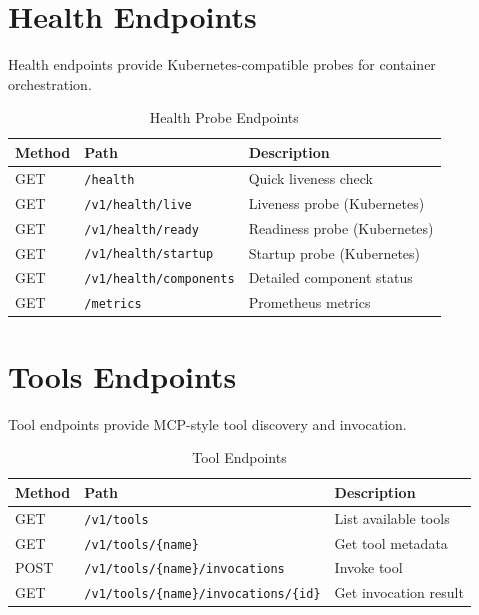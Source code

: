 \documentclass[a4paper,twoside]{sapthesis}
\begin{document}
\section{Health Endpoints}
\label{app:api:health}

Health endpoints provide Kubernetes-compatible probes for container orchestration.

\begin{table}[ht]
\centering
\caption{Health Probe Endpoints}
\label{tab:health-endpoints}
\small
\begin{tabularx}{\textwidth}{llX}
    \hline
    \textbf{Method} & \textbf{Path} & \textbf{Description} \\
    \hline
    GET & \texttt{/health} & Quick liveness check \\
    GET & \texttt{/v1/health/live} & Liveness probe (Kubernetes) \\
    GET & \texttt{/v1/health/ready} & Readiness probe (Kubernetes) \\
    GET & \texttt{/v1/health/startup} & Startup probe (Kubernetes) \\
    GET & \texttt{/v1/health/components} & Detailed component status \\
    GET & \texttt{/metrics} & Prometheus metrics \\
    \hline
\end{tabularx}
\end{table}

\section{Tools Endpoints}
\label{app:api:tools}

Tool endpoints provide MCP-style tool discovery and invocation.

\begin{table}[ht]
\centering
\caption{Tool Endpoints}
\label{tab:tool-endpoints}
\small
\begin{tabularx}{\textwidth}{llX}
    \hline
    \textbf{Method} & \textbf{Path} & \textbf{Description} \\
    \hline
    GET & \texttt{/v1/tools} & List available tools \\
    GET & \texttt{/v1/tools/\{name\}} & Get tool metadata \\
    POST & \texttt{/v1/tools/\{name\}/invocations} & Invoke tool \\
    GET & \texttt{/v1/tools/\{name\}/invocations/\{id\}} & Get invocation result \\
    \hline
\end{tabularx}
\end{table}
\end{document}
